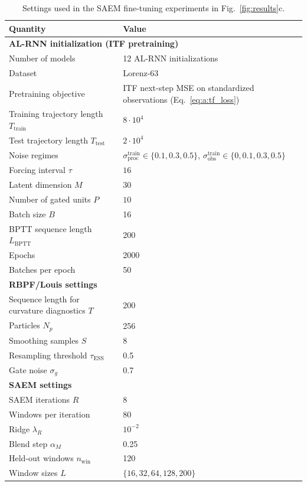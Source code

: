 \documentclass[twoside]{article}
\theoremstyle{plain}
\theoremstyle{definition}
\theoremstyle{remark}
\begin{document}
\begin{table}[t]
\centering
\caption{Settings used in the SAEM fine-tuning experiments in Fig.~\ref{fig:results}c.}
\label{tab:s:saem_hparams}
{\small\setlength{\tabcolsep}{4pt}\renewcommand{\arraystretch}{1.1}
\begin{tabular}{l l}
\hline
Quantity & Value \\
\hline
\multicolumn{2}{l}{\textbf{AL-RNN initialization (ITF pretraining)}}\\
Number of models & 12 AL-RNN initializations\\
Dataset & Lorenz-63 \\
Pretraining objective & ITF next-step MSE on standardized observations (Eq.~\eqref{eq:a:tf_loss}) \\
Training trajectory length $T_{\mathrm{train}}$ & $8\cdot 10^4$ \\
Test trajectory length $T_{\mathrm{test}}$ & $2\cdot 10^4$ \\
Noise regimes & $\sigma_{\mathrm{proc}}^{\mathrm{train}}\in\{0.1,0.3,0.5\}$, $\sigma_{\mathrm{obs}}^{\mathrm{train}}\in\{0,0.1,0.3,0.5\}$ \\
Forcing interval $\tau$ & $16$ \\
Latent dimension $M$ & 30 \\
Number of gated units $P$ & $10$ \\
Batch size $B$ & 16 \\
BPTT sequence length $L_{\mathrm{BPTT}}$ & 200 \\
Epochs & 2000 \\
Batches per epoch & 50 \\
\hline
\multicolumn{2}{l}{\textbf{RBPF/Louis settings}}\\
Sequence length for curvature diagnostics $T$ & 200 \\
Particles $N_p$ & 256 \\
Smoothing samples $S$ & 8 \\
Resampling threshold $\tau_{\mathrm{ESS}}$ & 0.5 \\
Gate noise $\sigma_g$ & 0.7 \\
\hline
\multicolumn{2}{l}{\textbf{SAEM settings}}\\
SAEM iterations $R$ & 8 \\
Windows per iteration & 80 \\
Ridge $\lambda_R$ & $10^{-2}$ \\
Blend step $\alpha_M$ & 0.25 \\
Held-out windows $n_{\mathrm{win}}$ & 120 \\
Window sizes $L$ & $\{16,32,64,128,200\}$ \\
\hline
\end{tabular}}
\end{table}
\end{document}
